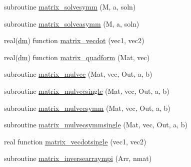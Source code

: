\begin{DoxyCompactItemize}
\item 
subroutine \mbox{\hyperlink{namespacematrixutils_afb220a70c7ec8bcc1eb1694588300540}{matrix\+\_\+solvesymm}} (M, a, soln)
\item 
subroutine \mbox{\hyperlink{namespacematrixutils_a2662807273dfd077b6501df4d09909d9}{matrix\+\_\+solveasymm}} (M, a, soln)
\item 
real(\mbox{\hyperlink{namespacematrixutils_a7bdc564986ea4d90f51201c75606ef3d}{dm}}) function \mbox{\hyperlink{namespacematrixutils_a14ec6bb3e63d084752f528c47653f7d7}{matrix\+\_\+vecdot}} (vec1, vec2)
\item 
real(\mbox{\hyperlink{namespacematrixutils_a7bdc564986ea4d90f51201c75606ef3d}{dm}}) function \mbox{\hyperlink{namespacematrixutils_affa7bde611de578a07d5a1bdf612f1b2}{matrix\+\_\+quadform}} (Mat, vec)
\item 
subroutine \mbox{\hyperlink{namespacematrixutils_a7192e418b9f0d6699a80da809931fed0}{matrix\+\_\+mulvec}} (Mat, vec, Out, a, b)
\item 
subroutine \mbox{\hyperlink{namespacematrixutils_a629395ae3092616dd7db4d401570ccd0}{matrix\+\_\+mulvecsingle}} (Mat, vec, Out, a, b)
\item 
subroutine \mbox{\hyperlink{namespacematrixutils_a4bcc2b4fc8b6f2fee0c142c280851c73}{matrix\+\_\+mulvecsymm}} (Mat, vec, Out, a, b)
\item 
subroutine \mbox{\hyperlink{namespacematrixutils_a83ffeb3e4788ff67e17e5f94b70bec3a}{matrix\+\_\+mulvecsymmsingle}} (Mat, vec, Out, a, b)
\item 
real function \mbox{\hyperlink{namespacematrixutils_a7c0b5ddd8a7ff3cd1231b2b56a63aefc}{matrix\+\_\+vecdotsingle}} (vec1, vec2)
\item 
subroutine \mbox{\hyperlink{namespacematrixutils_ae6aceb4eee59e9d9300a4d7139011aac}{matrix\+\_\+inversearraympi}} (Arr, nmat)
\end{DoxyCompactItemize}
